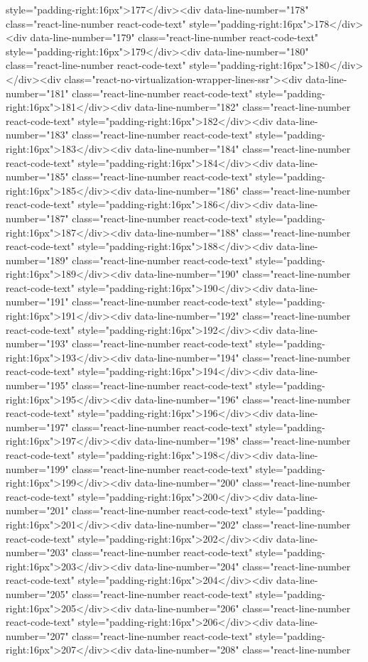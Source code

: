 {{{{{style="padding-right:16px">177</div><div data-line-number="178" class="react-line-number react-code-text" style="padding-right:16px">178</div><div data-line-number="179" class="react-line-number react-code-text" style="padding-right:16px">179</div><div data-line-number="180" class="react-line-number react-code-text" style="padding-right:16px">180</div></div><div class="react-no-virtualization-wrapper-lines-ssr"><div data-line-number="181" class="react-line-number react-code-text" style="padding-right:16px">181</div><div data-line-number="182" class="react-line-number react-code-text" style="padding-right:16px">182</div><div data-line-number="183" class="react-line-number react-code-text" style="padding-right:16px">183</div><div data-line-number="184" class="react-line-number react-code-text" style="padding-right:16px">184</div><div data-line-number="185" class="react-line-number react-code-text" style="padding-right:16px">185</div><div data-line-number="186" class="react-line-number react-code-text" style="padding-right:16px">186</div><div data-line-number="187" class="react-line-number react-code-text" style="padding-right:16px">187</div><div data-line-number="188" class="react-line-number react-code-text" style="padding-right:16px">188</div><div data-line-number="189" class="react-line-number react-code-text" style="padding-right:16px">189</div><div data-line-number="190" class="react-line-number react-code-text" style="padding-right:16px">190</div><div data-line-number="191" class="react-line-number react-code-text" style="padding-right:16px">191</div><div data-line-number="192" class="react-line-number react-code-text" style="padding-right:16px">192</div><div data-line-number="193" class="react-line-number react-code-text" style="padding-right:16px">193</div><div data-line-number="194" class="react-line-number react-code-text" style="padding-right:16px">194</div><div data-line-number="195" class="react-line-number react-code-text" style="padding-right:16px">195</div><div data-line-number="196" class="react-line-number react-code-text" style="padding-right:16px">196</div><div data-line-number="197" class="react-line-number react-code-text" style="padding-right:16px">197</div><div data-line-number="198" class="react-line-number react-code-text" style="padding-right:16px">198</div><div data-line-number="199" class="react-line-number react-code-text" style="padding-right:16px">199</div><div data-line-number="200" class="react-line-number react-code-text" style="padding-right:16px">200</div><div data-line-number="201" class="react-line-number react-code-text" style="padding-right:16px">201</div><div data-line-number="202" class="react-line-number react-code-text" style="padding-right:16px">202</div><div data-line-number="203" class="react-line-number react-code-text" style="padding-right:16px">203</div><div data-line-number="204" class="react-line-number react-code-text" style="padding-right:16px">204</div><div data-line-number="205" class="react-line-number react-code-text" style="padding-right:16px">205</div><div data-line-number="206" class="react-line-number react-code-text" style="padding-right:16px">206</div><div data-line-number="207" class="react-line-number react-code-text" style="padding-right:16px">207</div><div data-line-number="208" class="react-line-number }}}}}
